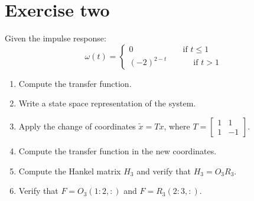 \section{Exercise two}

Given the impulse response:
\[\omega(t)=\begin{cases}
    0 \qquad\qquad\qquad \text{if }t\leq 1 \\
    (-2)^{2-t} \:\qquad\quad \text{if }t>1
\end{cases}\]
\begin{enumerate}
    \item Compute the transfer function.
    \item Write a state space representation of the system.
    \item Apply the change of coordinates $\tilde{x}=Tx$, where $T=\begin{bmatrix} 1 & 1 \\ 1 & -1 \end{bmatrix}$.
    \item Compute the transfer function in the new coordinates.
    \item Compute the Hankel matrix $H_3$ and verify that $H_3=O_3R_3$.
    \item Verify that $F=O_3(1:2,:)$ and $F=R_3(2:3,:)$.
\end{enumerate}

